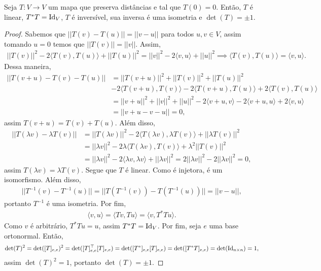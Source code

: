 \begin{proposition}
    Seja $T \colon V \to V$ um mapa que preserva distâncias e tal que $T(0) = 0$. Então, $T$ é linear, $T^* T = \operatorname{Id}_V$, $T$ é inversível, sua inversa é uma isometria e $\det(T) = \pm 1$.
\end{proposition}
\begin{proof}
    Sabemos que $||T(v) - T(u)|| = ||v - u||$ para todos $u, v \in V$, assim tomando $u = 0$ temos que $||T(v)|| = ||v||$. Assim, \begin{eqnarray}
        ||T(v)||^2 - 2\langle T(v), T(u) \rangle + ||T(u)||^2 = ||v||^2 - 2\langle v, u \rangle + ||u||^2 \implies \langle T(v), T(u) \rangle = \langle v, u \rangle.
    \end{eqnarray} Dessa maneira, \begin{align}
        ||T(v + u) - T(v) - T(u)|| &= ||T(v + u)||^2 + ||T(v)||^2 + ||T(u)||^2 \nonumber \\ &- 2\langle T(v + u), T(v) \rangle - 2\langle T(v + u), T(u) \rangle + 2\langle T(v), T(u)\rangle \\ &= ||v + u||^2 + ||v||^2 + ||u||^2 - 2\langle v+u, v \rangle - 2\langle v+u, u \rangle + 2\langle v,u \rangle \\ &= ||v + u - v - u|| = 0,
    \end{align} assim $T(v + u) = T(v) + T(u)$. Além disso, \begin{align}
        ||T(\lambda v) - \lambda T(v)|| &= ||T(\lambda v)||^2 - 2\langle T(\lambda v), \lambda T(v) \rangle + ||\lambda T(v)||^2 \\ &= ||\lambda v||^2 - 2\lambda \langle T(\lambda v), T(v) \rangle + \lambda^2||T(v)||^2 \\ &= ||\lambda v||^2 - 2\langle \lambda v, \lambda v \rangle + ||\lambda v||^2 = 2||\lambda v||^2 - 2||\lambda v||^2 = 0,
    \end{align} assim $T(\lambda v) = \lambda T(v)$. Segue que $T$ é linear. Como é injetora, é um isomorfismo. Além disso, \begin{eqnarray}
        ||T^{-1}(v) - T^{-1}(u)|| = ||T(T^{-1}(v)) - T(T^{-1}(u))|| = ||v - u||,
    \end{eqnarray} portanto $T^{-1}$ é uma isometria. Por fim, \begin{eqnarray}
        \langle v, u \rangle = \langle Tv, Tu \rangle = \langle v, T^*Tu \rangle.
    \end{eqnarray} Como $v$ é arbitrário, $T^*Tu = u$, assim $T^*T = \operatorname{Id}_V$. Por fim, seja $e$ uma base ortonormal. Então, \begin{eqnarray}
        \det(T)^2 = \det([T]_{e,e})^2 = \det([T]^\top_{e,e}[T]_{e,e}) = \det([T^*]_{e,e}[T]_{e,e}) = \det([T^*T]_{e,e}) = \det(\operatorname{Id}_{n \times n}) = 1,
    \end{eqnarray} assim $\det(T)^2 = 1$, portanto $\det(T) = \pm 1$.
\end{proof}

